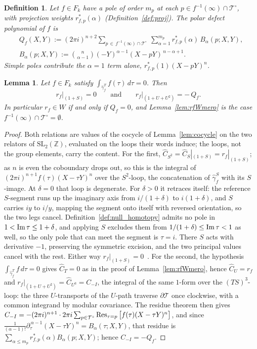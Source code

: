 \documentclass[11pt]{article}
\newtheorem{lemma}[theorem]{Lemma}
\newtheorem{definition}[theorem]{Definition}
\newcommand{\ZZ}{\mathbb{Z}}
\newcommand{\SLZ}{\mathrm{SL}_2(\ZZ)}
\begin{document}
\begin{definition}\label{def:Qf}
Let $f\in F_k$ have a pole of order $m_p$ at each $p\in f^{-1}(\infty)\cap\mathcal{T}^{\circ}$,
with projection weights $r^*_{f,p}(\alpha)$ (Definition~\ref{def:proj}). The \emph{polar defect
polynomial} of $f$ is
\begin{align}\label{eq:Qf}
&Q_f(X,Y):=(2\pi i)^{n+2}\!\!\sum_{p\,\in\,f^{-1}(\infty)\cap\mathcal{T}^{\circ}}\ \sum_{\alpha=1}^{m_p}
r^*_{f,p}(\alpha)\,B_\alpha(p;X,Y),
\\
&B_\alpha(p;X,Y):=\binom{n}{\alpha-1}(-Y)^{\alpha-1}(X-pY)^{\,n-\alpha+1}.
\end{align}
Simple poles contribute the $\alpha=1$ term alone, $r^*_{f,p}(1)(X-pY)^n$.
\end{definition}

\begin{lemma}\label{lem:rfWFk}
Let $f\in F_k$ satisfy $\int_{\hat\gamma^T_f}f(\tau)\,d\tau=0$. Then
\begin{equation}\label{eq:rfWFk}
r_f\big|_{(1+S)}=0
\qquad\text{and}\qquad
r_f\big|_{(1+U+U^2)}=-\,Q_f .
\end{equation}
In particular $r_f\in W$ if and only if $Q_f=0$, and Lemma~\ref{lem:rfWmero} is the case
$f^{-1}(\infty)\cap\mathcal{T}^{\circ}=\emptyset$.
\end{lemma}

\begin{proof}
Both relations are values of the cocycle of Lemma~\ref{lem:cocycle} on the two relators of
$\SLZ$, evaluated on the loops their words induce; the loops, not the group elements, carry
the content. For the first, $\hat C_{S^2}=\hat C_S|_{(1+S)}=r_f|_{(1+S)}$; as $n$ is even the
coboundary drops out, so this is the integral of $(2\pi i)^{n+1}f(\tau)(X-\tau Y)^n$ over the
$S^2$-loop, the concatenation of $\hat\gamma^S_f$ with its $S$-image. At $\delta=0$ that loop is
degenerate. For $\delta>0$ it retraces itself: the reference $S$-segment runs up the imaginary axis
from $i/(1+\delta)$ to $i(1+\delta)$, and $S$ carries $iy$ to $i/y$, mapping the segment onto itself
with reversed orientation, so the two legs cancel. Definition~\ref{def:null_homotopy} admits no pole
in $1<{\rm Im}\,\tau\le1+\delta$, and applying $S$ excludes them from
$1/(1+\delta)\le{\rm Im}\,\tau<1$ as well, so the only pole that can meet the segment is $\tau=i$.
There $S$ acts with derivative $-1$, preserving the symmetric excision, and the two principal values
cancel with the rest. Either way $r_f|_{(1+S)}=0$~\cite{VerifyScripts}. For the second, the
hypothesis
$\int_{\hat\gamma^T_f}f\,d\tau=0$ gives $\hat C_T=0$ as in the proof of
Lemma~\ref{lem:rfWmero}, hence $\hat C_U=r_f$ and
$r_f|_{(1+U+U^2)}=\hat C_{U^3}=C_{-I}$, the integral of the same $1$-form over the
$(TS)^3$-loop: the three $U$-transports of the $U$-path traverse $\partial\mathcal{T}$ once
clockwise, with a common integrand by modular covariance. The residue theorem then gives
$C_{-I}=-(2\pi i)^{n+1}\cdot2\pi i\sum_{p\in\mathcal{T}^{\circ}}
\mathop{\rm Res}_{\tau=p}\big[f(\tau)(X-\tau Y)^n\big]$, and since
$\tfrac{1}{(\alpha-1)!}\partial_\tau^{\,\alpha-1}(X-\tau Y)^n=B_\alpha(\tau;X,Y)$,
that residue is $\sum_{\alpha\le m_p}r^*_{f,p}(\alpha)B_\alpha(p;X,Y)$; hence
$C_{-I}=-Q_f$.
\end{proof}
\end{document}
